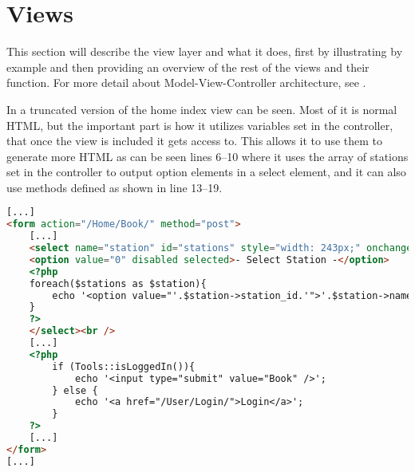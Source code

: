 \section{Views}
This section will describe the view layer and what it does, first by illustrating by example and then providing an overview of the rest of the views and their function. For more detail about Model-View-Controller architecture, see .

In  a truncated version of the home index view can be seen. Most of it is normal HTML, but the important part is how it utilizes variables set in the controller, that once the view is included it gets access to. This allows it to use them to generate more HTML as can be seen lines 6--10 where it uses the array of stations set in the controller to output option elements in a select element, and it can also use methods defined as shown in line 13--19.

\begin{lstlisting}[language=html, label=lst:homeIndexView, caption={Home Index View}]
[...]
<form action="/Home/Book/" method="post">
    [...]
    <select name="station" id="stations" style="width: 243px;" onchange="UpdateMarker()">
    <option value="0" disabled selected>- Select Station -</option>
    <?php
    foreach($stations as $station){
        echo '<option value="'.$station->station_id.'">'.$station->name.'</option>';
    }
    ?>
    </select><br />
    [...]
    <?php
        if (Tools::isLoggedIn()){
            echo '<input type="submit" value="Book" />';
        } else {
            echo '<a href="/User/Login/">Login</a>';
        }
    ?>
    [...]
</form>
[...]
\end{lstlisting}

